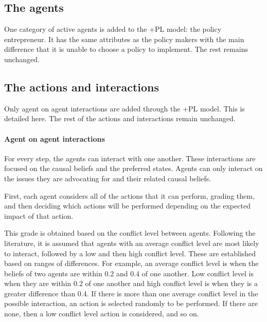 \documentclass[11pt]{article}
\begin{document}

\subsection{The agents}

One category of active agents is added to the +PL model: the policy entrepreneur. It has the same attributes as the policy makers with the main difference that it is unable to choose a policy to implement. The rest remains unchanged.



\subsection{The actions and interactions}


Only agent on agent interactions are added through the +PL model. This is detailed here. The rest of the actions and interactions remain unchanged.

\paragraph{Agent on agent interactions}

For every step, the agents can interact with one another. These interactions are focused on the causal beliefs and the preferred states. Agents can only interact on the issues they are advocating for and their related causal beliefs.


First, each agent considers all of the actions that it can perform, grading them, and then deciding which actions will be performed depending on the expected impact of that action.

This grade is obtained based on the conflict level between agents. Following the literature, it is assumed that agents with an average conflict level are most likely to interact, followed by a low and then high conflict level. These are established based on ranges of differences. For example, an average conflict level is when the beliefs of two agents are within 0.2 and 0.4 of one another. Low conflict level is when they are within 0.2 of one another and high conflict level is when they is a greater difference than 0.4. If there is more than one average conflict level in the possible interaction, an action is selected randomly to be performed. If there are none, then a low conflict level action is considered, and so on.
\end{document}
